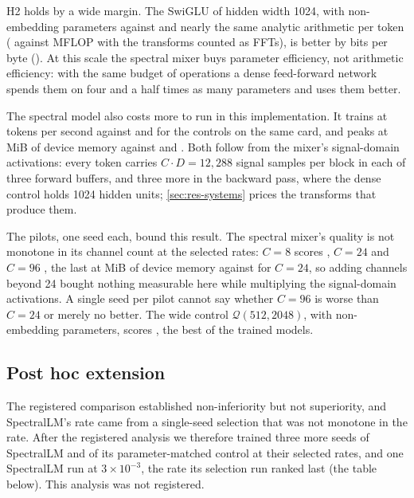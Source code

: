 H2 holds by a wide margin. The SwiGLU of hidden width 1024, with \ParamsQstd{}
non-embedding parameters against \ParamsS{} and nearly the same analytic
arithmetic per token (\MflopQstd{} against \MflopS{} MFLOP with the transforms
counted as FFTs), is better by \DiffSQstd{} bits per byte
(\DiffSQstdCI{}). At this scale the spectral mixer buys parameter efficiency,
not arithmetic efficiency: with the same budget of operations a dense
feed-forward network spends them on four and a half times as many parameters
and uses them better.

The spectral model also costs more to run in this implementation. It trains
at \TpsS{} tokens per second against \TpsQpar{} and \TpsQstd{} for the
controls on the same card, and peaks at \MemS{} MiB of device memory against
\MemQpar{} and \MemQstd{}. Both follow from the mixer's signal-domain
activations: every token carries $C\cdot D=12{,}288$ signal samples per block in
each of three forward buffers, and three more in the backward pass, where the
dense control holds 1024 hidden units; \cref{sec:res-systems} prices the
transforms that produce them.

The pilots, one seed each, bound this result. The spectral mixer's quality
is not monotone in its channel count at the selected rates: $C=8$ scores
\BpbSEight{}, $C=24$ \BpbS{} and $C=96$ \BpbSNinetySix{}, the last at
\MemSNinetySix{} MiB of device memory against \MemS{} for $C=24$, so adding
channels beyond 24 bought nothing measurable here while multiplying the
signal-domain activations. A single seed per pilot cannot say whether $C=96$
is worse than $C=24$ or merely no better. The wide control
$\mathcal{Q}(512,2048)$, with \ParamsQwide{} non-embedding parameters, scores
\BpbQwide{}, the best of the trained models.

\subsection{Post hoc extension}
\label{sec:res-extension}

The registered comparison established non-inferiority but not superiority, and
SpectralLM's rate came from a single-seed selection that was not monotone in
the rate. After the registered analysis we therefore trained three more
seeds of SpectralLM and of its parameter-matched control at their selected
rates, and one SpectralLM run at $3\times10^{-3}$, the rate its selection run
ranked last (the table below). This analysis was not registered.



